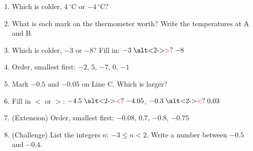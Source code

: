 \documentclass{beamer}
\newcommand{\ashow}[1]{\uncover<2->{\textcolor{red}{\small #1}}}
\newcommand{\ashowq}[1]{\alt<2->{\textcolor{red}{\small #1}}{?}}
\begin{document}
\begin{frame}
\begin{columns}[T]
\begin{multicols}{2}
\begin{enumerate}
  \item Which is colder, $4\,^\circ$C or $-4\,^\circ$C? \ashow{$-4\,^\circ$C}

  \item What is each mark on the thermometer worth? Write the temperatures at A and B. \ashow{$2\,^\circ$C per mark; A $=-6$, B $=4$}

  \item Which is colder, $-3$ or $-8$? Fill in: $-3 \mathrel{\text{\ashowq{$>$}}} -8$ \ashow{($-8$ is colder)}

  \item Order, smallest first: $-2$, $5$, $-7$, $0$, $-1$ \ashow{($-7,-2,-1,0,5$)}

  \columnbreak

  \item Mark $-0.5$ and $-0.05$ on Line C. Which is larger? \ashow{$-0.05$}

  \item Fill in $<$ or $>$: $-4.5 \mathrel{\text{\ashowq{$<$}}} -4.05$, $-0.3 \mathrel{\text{\ashowq{$<$}}} 0.03$

  \item (Extension) Order, smallest first: $-0.08$, $0.7$, $-0.8$, $-0.75$ \ashow{($-0.8$, $-0.75$, $-0.08$, $0.7$)}

  \item (Challenge) List the integers $n$: $-3\leq n<2$. Write a number between $-0.5$ and $-0.4$. \ashow{$-3,-2,-1,0,1$; e.g.\ $-0.45$}

\end{enumerate}
\end{multicols}

\end{columns}

\end{frame}
\end{document}
